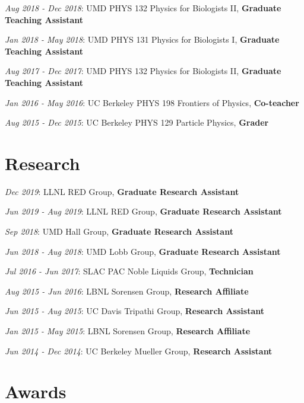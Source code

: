 \documentclass[
  10pt,
  letterpaper,
  DIV=11,
  numbers=noendperiod]{scrartcl}
\begin{document}
\textcolor{mygray}{\textit{Aug 2018 - Dec 2018}}: UMD PHYS 132 Physics
for Biologists II, \textbf{Graduate Teaching Assistant}

\textcolor{mygray}{\textit{Jan 2018 - May 2018}}: UMD PHYS 131 Physics
for Biologists I, \textbf{Graduate Teaching Assistant}

\textcolor{mygray}{\textit{Aug 2017 - Dec 2017}}: UMD PHYS 132 Physics
for Biologists II, \textbf{Graduate Teaching Assistant}

\textcolor{mygray}{\textit{Jan 2016 - May 2016}}: UC Berkeley PHYS 198
Frontiers of Physics, \textbf{Co-teacher}

\textcolor{mygray}{\textit{Aug 2015 - Dec 2015}}: UC Berkeley PHYS 129
Particle Physics, \textbf{Grader}

\hypertarget{fa-atom-research}{%
\section{\texorpdfstring{
Research}{ Research}}\label{fa-atom-research}}

\textcolor{mygray}{\textit{Dec 2019}}: LLNL RED Group, \textbf{Graduate
Research Assistant}

\textcolor{mygray}{\textit{Jun 2019 - Aug 2019}}: LLNL RED Group,
\textbf{Graduate Research Assistant}

\textcolor{mygray}{\textit{Sep 2018}}: UMD Hall Group, \textbf{Graduate
Research Assistant}

\textcolor{mygray}{\textit{Jun 2018 - Aug 2018}}: UMD Lobb Group,
\textbf{Graduate Research Assistant}

\textcolor{mygray}{\textit{Jul 2016 - Jun 2017}}: SLAC PAC Noble Liquids
Group, \textbf{Technician}

\textcolor{mygray}{\textit{Aug 2015 - Jun 2016}}: LBNL Sorensen Group,
\textbf{Research Affiliate}

\textcolor{mygray}{\textit{Jun 2015 - Aug 2015}}: UC Davis Tripathi
Group, \textbf{Research Assistant}

\textcolor{mygray}{\textit{Jan 2015 - May 2015}}: LBNL Sorensen Group,
\textbf{Research Affiliate}

\textcolor{mygray}{\textit{Jun 2014 - Dec 2014}}: UC Berkeley Mueller
Group, \textbf{Research Assistant}

\hypertarget{fa-trophy-awards}{%
\section{\texorpdfstring{
Awards}{ Awards}}\label{fa-trophy-awards}}
\end{document}
